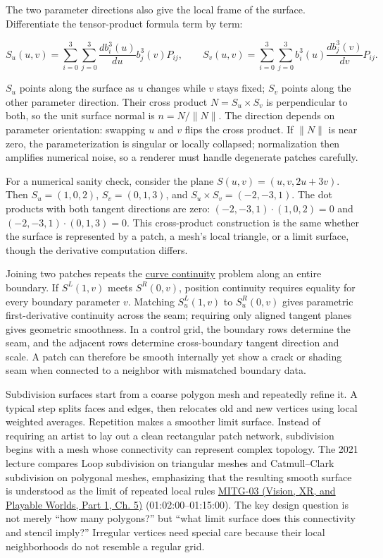 The two parameter directions also give the local frame of the surface. Differentiate the tensor-product formula term by term:

\[
S_u(u,v)=\sum_{i=0}^{3}\sum_{j=0}^{3}\frac{d b_i^3(u)}{du}b_j^3(v)P_{ij},\qquad
S_v(u,v)=\sum_{i=0}^{3}\sum_{j=0}^{3}b_i^3(u)\frac{d b_j^3(v)}{dv}P_{ij}.
\]

\(S_u\) points along the surface as \(u\) changes while \(v\) stays fixed; \(S_v\) points along the other parameter direction. Their cross product \(N=S_u\times S_v\) is perpendicular to both, so the unit surface normal is \(n=N/\|N\|\). The direction depends on parameter orientation: swapping \(u\) and \(v\) flips the cross product. If \(\|N\|\) is near zero, the parameterization is singular or locally collapsed; normalization then amplifies numerical noise, so a renderer must handle degenerate patches carefully.

For a numerical sanity check, consider the plane \(S(u,v)=(u,v,2u+3v)\). Then \(S_u=(1,0,2)\), \(S_v=(0,1,3)\), and \(S_u\times S_v=(-2,-3,1)\). The dot products with both tangent directions are zero: \((-2,-3,1)\cdot(1,0,2)=0\) and \((-2,-3,1)\cdot(0,1,3)=0\). This cross-product construction is the same whether the surface is represented by a patch, a mesh's local triangle, or a limit surface, though the derivative computation differs.

Joining two patches repeats the \hyperref[appendix-f28eeec97a3d]{curve continuity} problem along an entire boundary. If \(S^L(1,v)\) meets \(S^R(0,v)\), position continuity requires equality for every boundary parameter \(v\). Matching \(S^L_u(1,v)\) to \(S^R_u(0,v)\) gives parametric first-derivative continuity across the seam; requiring only aligned tangent planes gives geometric smoothness. In a control grid, the boundary rows determine the seam, and the adjacent rows determine cross-boundary tangent direction and scale. A patch can therefore be smooth internally yet show a crack or shading seam when connected to a neighbor with mismatched boundary data.

Subdivision surfaces start from a coarse polygon mesh and repeatedly refine it. A typical step splits faces and edges, then relocates old and new vertices using local weighted averages. Repetition makes a smoother limit surface. Instead of requiring an artist to lay out a clean rectangular patch network, subdivision begins with a mesh whose connectivity can represent complex topology. The 2021 lecture compares Loop subdivision on triangular meshes and Catmull--Clark subdivision on polygonal meshes, emphasizing that the resulting smooth surface is understood as the limit of repeated local rules \href{../07-Vision-XR-and-Playable-Worlds-P01/main.pdf\#nameddest=04-visual-computing-ii-ch036-mitg-03---curves-and-surfaces}{MITG-03 (Vision, XR, and Playable Worlds, Part 1, Ch. 5)} (01:02:00--01:15:00). The key design question is not merely ``how many polygons?'' but ``what limit surface does this connectivity and stencil imply?'' Irregular vertices need special care because their local neighborhoods do not resemble a regular grid.

